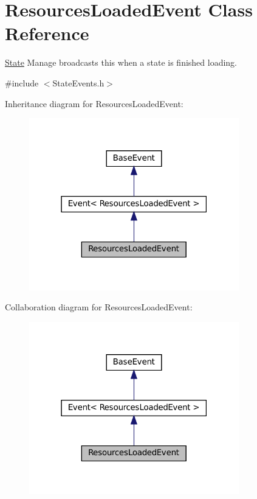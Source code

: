 \hypertarget{classResourcesLoadedEvent}{}\section{Resources\+Loaded\+Event Class Reference}
\label{classResourcesLoadedEvent}


\hyperlink{classState}{State} Manage broadcasts this when a state is finished loading.  




{\ttfamily \#include $<$State\+Events.\+h$>$}



Inheritance diagram for Resources\+Loaded\+Event\+:\nopagebreak
\begin{figure}[H]
\begin{center}
\leavevmode
\includegraphics[width=259pt]{classResourcesLoadedEvent__inherit__graph}
\end{center}
\end{figure}


Collaboration diagram for Resources\+Loaded\+Event\+:\nopagebreak
\begin{figure}[H]
\begin{center}
\leavevmode
\includegraphics[width=259pt]{classResourcesLoadedEvent__coll__graph}
\end{center}
\end{figure}
